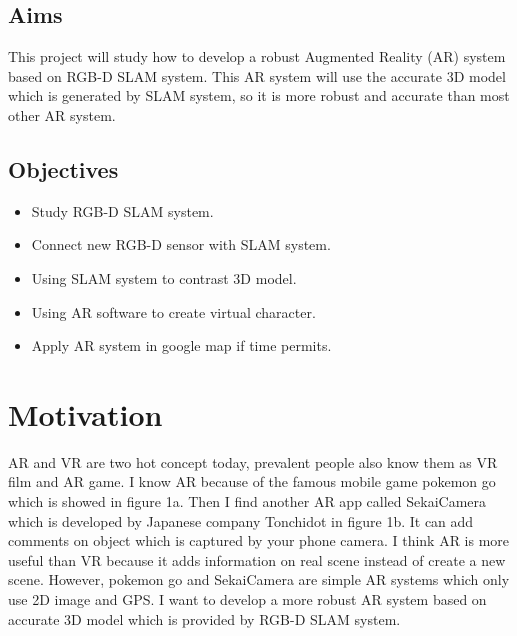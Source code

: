 \documentclass[a4paper,11pt]{article}
\begin{document}
\subsection{Aims}
This project will study how to develop a robust Augmented Reality (AR) system based on RGB-D SLAM system. This AR system will use the accurate 3D model which is generated by SLAM system, so it is more robust and accurate than most other AR system. 
\subsection{Objectives}
\begin{itemize}
\item Study RGB-D SLAM system.
\item Connect new RGB-D sensor with SLAM system.
\item Using SLAM system to contrast 3D model.
\item Using AR software to create virtual character.
\item Apply AR system in google map if time permits.
\end{itemize}


\section{Motivation}
AR and VR are two hot concept today, prevalent people also know them as VR film and AR game. I know AR because of the famous mobile game pokemon go which is showed in figure 1a. Then I find another AR app called SekaiCamera which is developed by Japanese company Tonchidot in figure 1b. It can add comments on object which is captured by your phone camera. I think AR is more useful than VR because it adds information on real scene instead of create a new scene. However, pokemon go and SekaiCamera are simple AR systems which only use 2D image and GPS. I want to develop a more robust AR system based on accurate 3D model which is provided by RGB-D SLAM system.
\end{document}
